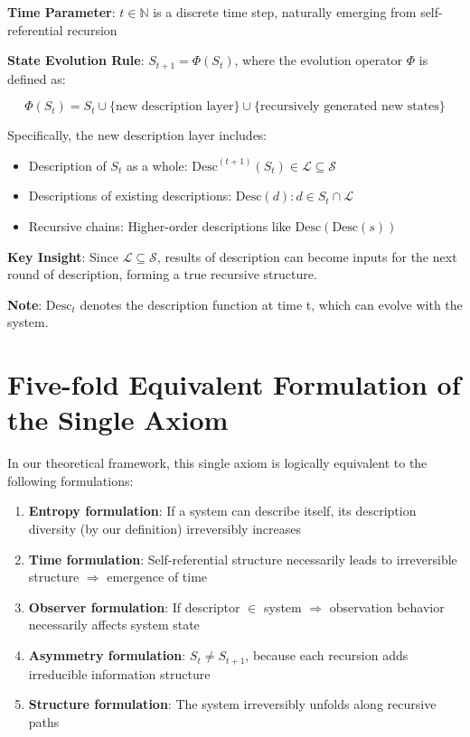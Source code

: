 \textbf{Time Parameter}: $t \in \mathbb{N}$ is a discrete time step, naturally emerging from self-referential recursion

\textbf{State Evolution Rule}: $S_{t+1} = \Phi(S_t)$, where the evolution operator $\Phi$ is defined as:

\begin{equation}
\Phi(S_t) = S_t \cup \{\text{new description layer}\} \cup \{\text{recursively generated new states}\}
\end{equation}

Specifically, the new description layer includes:
\begin{itemize}
\item Description of $S_t$ as a whole: $\text{Desc}^{(t+1)}(S_t) \in \mathcal{L} \subseteq \mathcal{S}$
\item Descriptions of existing descriptions: ${\text{Desc}(d) : d \in S_t \cap \mathcal{L}}$
\item Recursive chains: Higher-order descriptions like $\text{Desc}(\text{Desc}(s))$
\end{itemize}

\textbf{Key Insight}: Since $\mathcal{L} \subseteq \mathcal{S}$, results of description can become inputs for the next round of description, forming a true recursive structure.

\textbf{Note}: $\text{Desc}_t$ denotes the description function at time t, which can evolve with the system.

\section{Five-fold Equivalent Formulation of the Single Axiom}
\label{sec:ch01_axiom_and_derivation:five-fold-equivalent-formulation-of-the-single-axiom}

In our theoretical framework, this single axiom is logically equivalent to the following formulations:

\begin{enumerate}
\item \textbf{Entropy formulation}: If a system can describe itself, its description diversity (by our definition) irreversibly increases
\item \textbf{Time formulation}: Self-referential structure necessarily leads to irreversible structure $\Rightarrow$ emergence of time
\item \textbf{Observer formulation}: If descriptor $\in$ system $\Rightarrow$ observation behavior necessarily affects system state
\item \textbf{Asymmetry formulation}: $S_t \neq S_{t+1}$, because each recursion adds irreducible information structure
\item \textbf{Structure formulation}: The system irreversibly unfolds along recursive paths
\end{enumerate}

